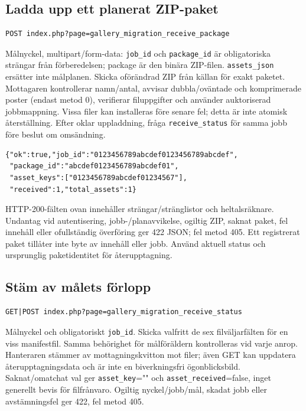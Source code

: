 \documentclass[11pt,a4paper]{article}
\newcommand{\codeword}[1]{\nolinkurl{#1}}
\begin{document}
\subsection{\texorpdfstring{Ladda upp ett planerat ZIP-paket}{Ladda upp ett planerat ZIP-paket}}

\label{api352:migration-receive-package}

\begin{lstlisting}[language={}]
POST index.php?page=gallery_migration_receive_package
\end{lstlisting}

Målnyckel, multipart/form-data: \codeword{job_id} och \codeword{package_id} är obligatoriska
strängar från förberedelsen; package är den binära ZIP-filen. \codeword{assets_json}
ersätter inte målplanen. Skicka oförändrad ZIP från källan för exakt paketet. Mottagaren
kontrollerar namn/antal, avvisar dubbla/oväntade och komprimerade poster (endast metod 0),
verifierar filuppgifter och använder auktoriserad jobbmappning. Vissa filer kan installeras
före senare fel; detta är inte atomisk återställning. Efter oklar uppladdning, fråga
\codeword{receive_status} för samma jobb före beslut om omsändning.

\begin{lstlisting}[language={}]
{"ok":true,"job_id":"0123456789abcdef0123456789abcdef",
 "package_id":"abcdef0123456789abcdef01",
 "asset_keys":["0123456789abcdef01234567"],
 "received":1,"total_assets":1}
\end{lstlisting}

HTTP-200-fälten ovan innehåller strängar/stränglistor och heltalsräknare. Undantag vid
autentisering, jobb-/planavvikelse, ogiltig ZIP, saknat paket, fel innehåll eller
ofullständig överföring ger 422 JSON; fel metod 405. Ett registrerat paket tillåter inte
byte av innehåll eller jobb. Använd aktuell status och ursprunglig paketidentitet för
återupptagning.

\subsection{\texorpdfstring{Stäm av målets förlopp}{Stäm av målets förlopp}}

\label{api352:migration-receive-status}

\begin{lstlisting}[language={}]
GET|POST index.php?page=gallery_migration_receive_status
\end{lstlisting}

Målnyckel och obligatoriskt \codeword{job_id}. Skicka valfritt de sex filväljarfälten för en
viss manifestfil. Samma behörighet för målföräldern kontrolleras vid varje anrop. Hanteraren
stämmer av mottagningskvitton mot filer; även GET kan uppdatera återupptagningsdata och är
inte en biverkningsfri ögonblicksbild. Saknat/omatchat val ger \codeword{asset_key}="" och
\codeword{asset_received}=false, inget generellt bevis för filfrånvaro. Ogiltig
nyckel/jobb/mål, skadat jobb eller avstämningsfel ger 422, fel metod 405.
\end{document}
